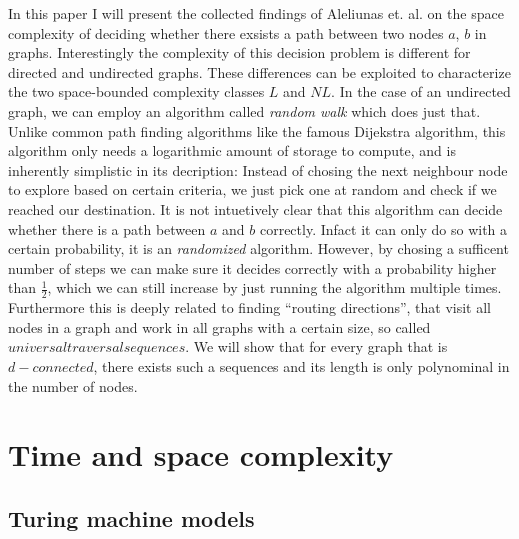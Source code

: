 


In this paper I will present the collected findings of Aleliunas et. al.
on the space complexity of deciding whether there exsists a path between
two nodes $a$, $b$ in graphs. Interestingly the complexity of this
decision problem is different for directed and undirected graphs. These
differences can be exploited to characterize the two space-bounded
complexity classes $L$ and $NL$. In the case of an undirected graph, we
can employ an algorithm called \emph{random walk} which does just that.
Unlike common path finding algorithms like the famous Dijekstra
algorithm, this algorithm only needs a logarithmic amount of storage to
compute, and is inherently simplistic in its decription: Instead of
chosing the next neighbour node to explore based on certain criteria, we
just pick one at random and check if we reached our destination. It is
not intuetively clear that this algorithm can decide whether there is a
path between $a$ and $b$ correctly. Infact it can only do so with a
certain probability, it is an \emph{randomized} algorithm. However, by
chosing a sufficent number of steps we can make sure it decides
correctly with a probability higher than $\frac{1}{2}$, which we can
still increase by just running the algorithm multiple times. Furthermore
this is deeply related to finding ``routing directions'', that visit all
nodes in a graph and work in all graphs with a certain size, so called
$universal traversal sequences$. We will show that for every graph that
is $d-connected$, there exists such a sequences and its length is only
polynominal in the number of nodes.

\chapter{Time and space complexity}\label{time-and-space-complexity}

\section{Turing machine models}\label{turing-machine-models}

